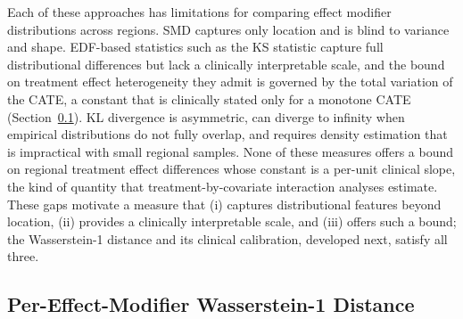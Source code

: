 \documentclass[AMA,Times1COL]{WileyNJDv5}
\begin{document}
Each of these approaches has limitations for comparing effect modifier distributions across regions. SMD captures only location and is blind to variance and shape. EDF-based statistics such as the KS statistic capture full distributional differences but lack a clinically interpretable scale, and the bound on treatment effect heterogeneity they admit is governed by the total variation of the CATE, a constant that is clinically stated only for a monotone CATE (Section~\ref{sec:nabcd_metric}). KL divergence is asymmetric, can diverge to infinity when empirical distributions do not fully overlap, and requires density estimation that is impractical with small regional samples. None of these measures offers a bound on regional treatment effect differences whose constant is a per-unit clinical slope, the kind of quantity that treatment-by-covariate interaction analyses estimate. These gaps motivate a measure that (i) captures distributional features beyond location, (ii) provides a clinically interpretable scale, and (iii) offers such a bound; the Wasserstein-1 distance and its clinical calibration, developed next, satisfy all three.

\subsection{Per-Effect-Modifier Wasserstein-1 Distance}\label{sec:nabcd_metric}
\end{document}
